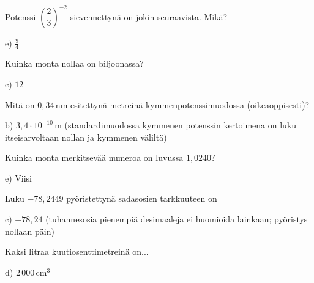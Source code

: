 \begin{tehtava}
Potenssi $\left( \dfrac{2}{3} \right)^{-2}$ sievennettynä on jokin seuraavista. Mikä?
\begin{vastaus}
e) $\frac{9}{4}$
\end{vastaus}
\end{tehtava}

\begin{tehtava}
Kuinka monta nollaa on biljoonassa?
\begin{vastaus}
c) $12$
\end{vastaus}
\end{tehtava}

\begin{tehtava}
Mitä on $0,34$\,nm esitettynä metreinä kymmenpotenssimuodossa (oikeaoppisesti)?
\begin{vastaus}
b) $3,4 \cdot 10^{-10}$\,m (standardimuodossa kymmenen potenssin kertoimena on luku itseisarvoltaan nollan ja kymmenen väliltä)
\end{vastaus}
\end{tehtava}

\begin{tehtava}
Kuinka monta merkitsevää numeroa on luvussa $1,0240$?
\begin{vastaus}
e) Viisi
\end{vastaus}
\end{tehtava}

\begin{tehtava}
Luku $-78,2449$ pyöristettynä sadasosien tarkkuuteen on
\begin{vastaus}
c) $-78,24$ (tuhannesosia pienempiä desimaaleja ei huomioida lainkaan; pyöristys nollaan päin)
\end{vastaus}
\end{tehtava}

\begin{tehtava}
Kaksi litraa kuutiosenttimetreinä on...
	\begin{vastaus}
	d) $2\,000$\,cm$^3$
	\end{vastaus}
\end{tehtava}


